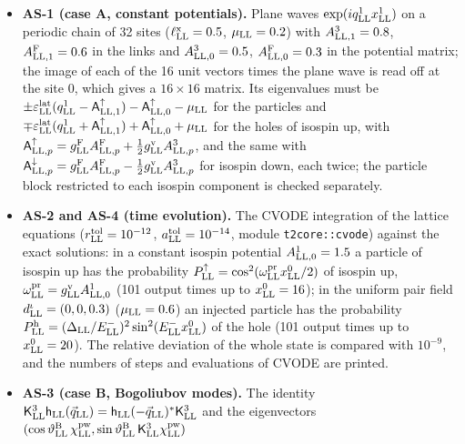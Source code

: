 \documentclass[
  10pt,
]{article}
\providecommand{\tightlist}{%
  \setlength{\itemsep}{0pt}\setlength{\parskip}{0pt}}
\begin{document}
\begin{itemize}
\tightlist
\item
  \textbf{AS-1 (case A, constant potentials).} Plane waves
  \(\exp(iq^1_{\rm LL}x^1_{\rm LL})\) on a periodic chain of 32 sites
  (\(\ell^{\rm x}_{\rm LL}=0.5\), \(\mu_{\rm LL}=0.2\)) with
  \(A^3_{{\rm LL},1}=0.8\), \(A^{\rm F}_{{\rm LL},1}=0.6\) in the links
  and \(A^3_{{\rm LL},0}=0.5\), \(A^{\rm F}_{{\rm LL},0}=0.3\) in the
  potential matrix; the image of each of the 16 unit vectors times the
  plane wave is read off at the site 0, which gives a \(16\times16\)
  matrix. Its eigenvalues must be
  \(\pm\varepsilon^{\rm lat}_{\rm LL}(q^1_{\rm LL}-\mathsf A^\uparrow_{{\rm LL},1})-\mathsf A^\uparrow_{{\rm LL},0}-\mu_{\rm LL}\)
  for the particles and
  \(\mp\varepsilon^{\rm lat}_{\rm LL}(q^1_{\rm LL}+\mathsf A^\uparrow_{{\rm LL},1})+\mathsf A^\uparrow_{{\rm LL},0}+\mu_{\rm LL}\)
  for the holes of isospin up, with
  \(\mathsf A^\uparrow_{{\rm LL},p}=g^{\rm F}_{\rm LL}A^{\rm F}_{{\rm LL},p}+\tfrac12g^{\rm v}_{\rm LL}A^3_{{\rm LL},p}\),
  and the same with
  \(\mathsf A^\downarrow_{{\rm LL},p}=g^{\rm F}_{\rm LL}A^{\rm F}_{{\rm LL},p}-\tfrac12g^{\rm v}_{\rm LL}A^3_{{\rm LL},p}\)
  for isospin down, each twice; the particle block restricted to each
  isospin component is checked separately.
\item
  \textbf{AS-2 and AS-4 (time evolution).} The CVODE integration of the
  lattice equations (\(r^{\rm tol}_{\rm LL}=10^{-12}\),
  \(a^{\rm tol}_{\rm LL}=10^{-14}\), module \texttt{t2core::cvode})
  against the exact solutions: in a constant isospin potential
  \(A^1_{{\rm LL},0}=1.5\) a particle of isospin up has the probability
  \(P^\uparrow_{\rm LL}=\cos^2(\omega^{\rm pr}_{\rm LL}x^0_{\rm LL}/2)\)
  of isospin up,
  \(\omega^{\rm pr}_{\rm LL}=g^{\rm v}_{\rm LL}A^1_{{\rm LL},0}\) (101
  output times up to \(x^0_{\rm LL}=16\)); in the uniform pair field
  \(d^\iota_{\rm LL}=(0,0,0.3)\) (\(\mu_{\rm LL}=0.6\)) an injected
  particle has the probability
  \(P^{\rm h}_{\rm LL}=(\Delta_{\rm LL}/E^-_{\rm LL})^2\sin^2(E^-_{\rm LL}x^0_{\rm LL})\)
  of the hole (101 output times up to \(x^0_{\rm LL}=20\)). The relative
  deviation of the whole state is compared with \(10^{-9}\), and the
  numbers of steps and evaluations of CVODE are printed.
\item
  \textbf{AS-3 (case B, Bogoliubov modes).} The identity
  \(\mathsf K^3_{\rm LL}\mathsf h_{\rm LL}(\vec q_{\rm LL})=\mathsf h_{\rm LL}(-\vec q_{\rm LL})^*\mathsf K^3_{\rm LL}\)
  and the eigenvectors
  \((\cos\vartheta^{\rm B}_{\rm LL}\,\chi^{\rm pw}_{\rm LL},\sin\vartheta^{\rm B}_{\rm LL}\,\mathsf K^3_{\rm LL}\chi^{\rm pw}_{\rm LL})\)

\end{itemize}
\end{document}
